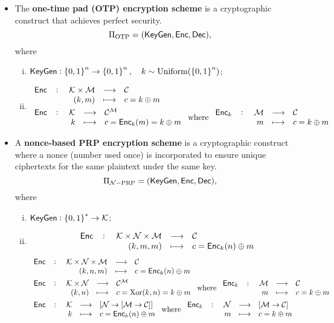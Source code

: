 \begin{itemize}
	\item The \textbf{one-time pad (OTP) encryption scheme} is a cryptographic construct that achieves perfect security. \[
	\Pi_{\text{OTP}}=(\mathsf{KeyGen},\mathsf{Enc},\mathsf{Dec}),
	\] where \begin{enumerate}[(i)]
		\item $\mathsf{KeyGen}:\set{0,1}^n\to\set{0,1}^n,\quad k\sim\text{Uniform}(\set{0,1}^n)$;
		\item \begin{align*}
			&\fullfunction{\enc}{\keyspace\times\messagespace}{\ciphertext}{(k,m)}{c=k\oplus m}\\
			&\fullfunction{\enc}{\keyspace}{\ciphertext^{\messagespace}}{k}{c=\enc_{k}(m)=k\oplus m}\ \text{where}\ \fullfunction{\enc_k}{\messagespace}{\ciphertext}{m}{c=k\oplus m}
		\end{align*}
	\end{enumerate}
	\item A \textbf{nonce-based PRP encryption scheme} is a cryptographic construct where a nonce (number used once) is incorporated to ensure unique ciphertexts for the same plaintext under the same key. 
	\[
	\Pi_{\mathcal{N}-\text{PRP}}=(\mathsf{KeyGen},\mathsf{Enc},\mathsf{Dec}),
	\] where \begin{enumerate}[(i)]
		\item $\mathsf{KeyGen}:\set{0,1}^*\to\mathcal{K}$;
		\item \[
		\fullfunction{\enc}{\keyspace\times\nonce\times\messagespace}{\ciphertext}{(k,m, m)}{c=\enc_k(n)\oplus m}
		\]\begin{align*}
			&\fullfunction{\enc}{\keyspace\times\nonce\times\messagespace}{\ciphertext}{(k,n,m)}{c=\enc_k(n)\oplus m}\\
			&\fullfunction{\enc}{\keyspace\times\nonce}{\ciphertext^{\messagespace}}{(k,n)}{c=\text{Xor}(k,n)=k\oplus m}\ \text{where}\ \fullfunction{\enc_k}{\messagespace}{\ciphertext}{m}{c=k\oplus m}\\
			&\fullfunction{\enc}{\keyspace}{[\nonce\to[\messagespace\to\ciphertext]]}{k}{c=\enc_k(n)\oplus m}\ \text{where}\ \fullfunction{\enc_k}{\nonce}{[\messagespace\to\ciphertext]}{m}{c=k\oplus m}
		\end{align*}
	\end{enumerate}
\end{itemize}

